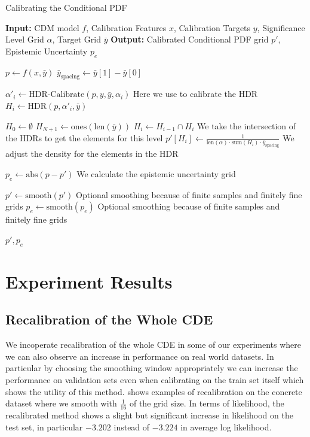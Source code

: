 \begin{algorithm}
    \caption{Calibrating the Conditional PDF}\label{alg:calibrate_pdf}
    \begin{algorithmic}
        \STATE\textbf{Input:} CDM model $f$, Calibration Features $x$, Calibration Targets $y$, Significance Level Grid $\alpha$, Target Grid $\bar{y}$
        \STATE\textbf{Output:} Calibrated Conditional PDF grid $p'$, Epistemic Uncertainty $p_e$

        \STATE$p \leftarrow f(x, \bar{y})$
        \STATE$\bar{y}_{\text{spacing}} \leftarrow \bar{y}[1] - \bar{y}[0]$

        \STATE$\alpha'_i \leftarrow \text{HDR-Calibrate}(p, y, \bar{y}, \alpha_i)$ Here we use  to calibrate the HDR
        \STATE$H_i \leftarrow \text{HDR}(p, \alpha'_i, \bar{y})$
        \ENDFOR%

        \STATE$H_0 \leftarrow \emptyset$
        \STATE$H_{N+1} \leftarrow \text{ones}(\text{len}(\bar{y}))$
        \STATE$H_i \leftarrow H_{i - 1} \cap H_i$ We take the intersection of the HDRs to get the elements for this level
        \STATE$p'[H_i] \leftarrow \frac{1}{\text{len}(\alpha) \cdot \text{sum}(H_i) \cdot \bar{y}_{\text{spacing}}}$ We adjust the density for the elements in the HDR
        \ENDFOR%

        \STATE$p_e \leftarrow \text{abs}(p - p')$ We calculate the epistemic uncertainty grid

        \STATE$p' \leftarrow \text{smooth}(p')$ Optional smoothing because of finite samples and finitely fine grids
        \STATE$p_e \leftarrow \text{smooth}(p_e)$ Optional smoothing because of finite samples and finitely fine grids

        \RETURN$p', p_e$
    \end{algorithmic}
\end{algorithm}

\section{Experiment Results}\label{sec:results}

\subsection{Recalibration of the Whole CDE}

We incoperate recalibration of the whole CDE in some of our experiments where we can also observe an increase in performance on real world datasets. In particular by choosing the smoothing window appropriately we can increase the performance on validation sets even when calibrating on the train set itself which shows the utility of this method.  shows examples of recalibration on the concrete dataset where we smooth with $\frac{1}{16}$ of the grid size. In terms of likelihood, the recalibrated method shows a slight but significant increase in likelihood on the test set, in particular $-3.202$ instead of $-3.224$ in average log likelihood.

